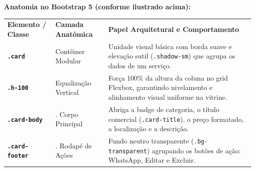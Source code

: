 \noindent\textbf{Anatomia no Bootstrap 5 (conforme ilustrado acima):}

\noindent
\begin{tcolorbox}[
    enhanced,
    colback=white,
    colframe=azulTitulo!60,
    arc=4pt,
    boxrule=0.8pt,
    top=0pt, bottom=0pt, left=0pt, right=0pt,
    shadow={1mm}{-1mm}{0mm}{black!8}
]
\small
\renewcommand{\arraystretch}{1.12}
\begin{tabularx}{\linewidth}{>{\raggedright\arraybackslash}p{3.2cm} >{\raggedright\arraybackslash}p{2.5cm} >{\raggedright\arraybackslash}X}
\rowcolor{azulTitulo}
\textbf{\color{white}\footnotesize Elemento / Classe} & 
\textbf{\color{white}\footnotesize Camada Anatômica} & 
\textbf{\color{white}\footnotesize Papel Arquitetural e Comportamento} \\
\rowcolor{white}
\colorbox{azulTitulo!8}{\textbf{\texttt{.card}}} & 
Contêiner Modular & 
Unidade visual básica com borda suave e elevação sutil (\texttt{.shadow-sm}) que agrupa os dados de um serviço. \\
\hline
\rowcolor{cinzaFundo}
\colorbox{azulTitulo!8}{\textbf{\texttt{.h-100}}} & 
Equalização Vertical & 
Força 100\% da altura da coluna no grid Flexbox, garantindo nivelamento e alinhamento visual uniforme na vitrine. \\
\hline
\rowcolor{white}
\hspace*{4pt}\colorbox{azulTitulo!12}{\textbf{\texttt{.card-body}}} & 
1. Corpo Principal & 
Abriga a badge de categoria, o título comercial (\texttt{.card-title}), o preço formatado, a localização e a descrição. \\
\hline
\rowcolor{cinzaFundo}
\hspace*{4pt}\colorbox{azulTitulo!12}{\textbf{\texttt{.card-footer}}} & 
2. Rodapé de Ações & 
Fundo neutro transparente (\texttt{.bg-transparent}) agrupando os botões de ação: WhatsApp, Editar e Excluir.
\end{tabularx}
\end{tcolorbox}


